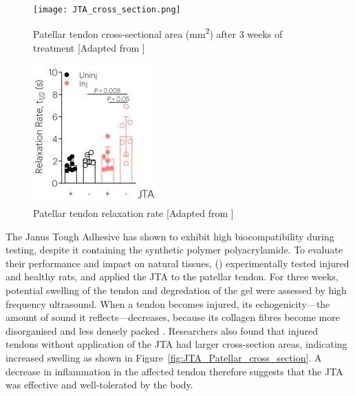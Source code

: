 \begin{figure}[ht]
    \centering
    \begin{minipage}[b]{0.45\textwidth}
        \centering
        \texttt{[image: JTA\_cross\_section.png]}
        \caption{Patellar tendon cross-sectional area (mm\textsuperscript{2}) after 3 weeks of treatment [Adapted from \cite{freedmanEnhancedTendonHealing2022}]}
        \label{fig:JTA_Patellar_cross_section}
    \end{minipage}
    \hfill
    \begin{minipage}[b]{0.45\textwidth}
        \centering
        \includegraphics[width=0.6\linewidth]{Figures/JTA_relaxation_patellar.jpeg}
        \caption{Patellar tendon relaxation rate [Adapted from \cite{freedmanEnhancedTendonHealing2022}]}
        \label{fig:JTA_Patellar_relaxation}
    \end{minipage}
\end{figure}

The Janus Tough Adhesive has shown to exhibit high biocompatibility during testing, despite it containing the synthetic polymer polyacrylamide. To evaluate their performance and impact on natural tissues, \citeauthor{freedmanEnhancedTendonHealing2022} (\citeyear{freedmanEnhancedTendonHealing2022}) experimentally tested  injured and healthy rats, and applied the JTA to the patellar tendon.
For three weeks, potential swelling of the tendon and degredation of the gel were assessed by high frequency ultrasound. When a tendon becomes injured, its echogenicity---the amount of sound it reflects---decreases, because its collagen fibres become more disorganised and less densely packed \autocite{hodgsonTendonLigamentImaging2012}.
Researchers also found that injured tendons without application of the JTA had larger cross-section areas, indicating increased swelling as shown in Figure~\ref{fig:JTA_Patellar_cross_section}. A decrease in inflammation in the affected tendon therefore suggests that the JTA was effective and well-tolerated by the body.

